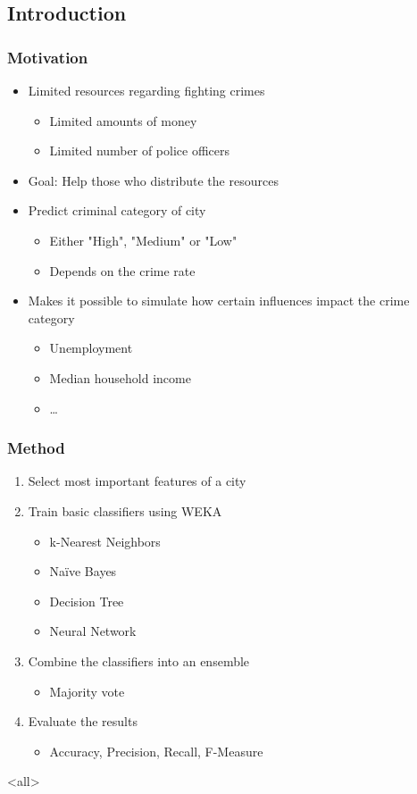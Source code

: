 \mode*

\begin{frame}
  \section{Introduction}
  \frametitle{Motivation}
  \onslide<+->
  \begin{itemize}
    \item<+-> Limited resources regarding fighting crimes
      \begin{itemize}
        \item<+-> Limited amounts of money
        \item<+-> Limited number of police officers
      \end{itemize}
    \item<+-> Goal: Help those who distribute the resources
    \item<+-> Predict criminal category of city
      \begin{itemize}
        \item<+-> Either "High", "Medium" or "Low"
        \item<+-> Depends on the crime rate
      \end{itemize}
    \item<+-> Makes it possible to simulate how certain influences impact the crime category
      \begin{itemize}
        \item<+-> Unemployment
        \item<+-> Median household income
        \item<+-> \ldots
      \end{itemize}
  \end{itemize}
\end{frame}

\begin{frame}
  \frametitle{Method}
  \onslide<+->
  \begin{enumerate}
    \item<+-> Select most important features of a city
    \item<+-> Train basic classifiers using WEKA
      \begin{itemize}
        \item<+-> k-Nearest Neighbors
        \item<+-> Na\"ive Bayes
        \item<+-> Decision Tree
        \item<+-> Neural Network
      \end{itemize}
    \item<+-> Combine the classifiers into an ensemble
      \begin{itemize}
        \item<+-> Majority vote
      \end{itemize}
    \item<+-> Evaluate the results
      \begin{itemize}
        \item<+-> Accuracy, Precision, Recall, F-Measure
      \end{itemize}
  \end{enumerate}
\end{frame}

\mode<all>
